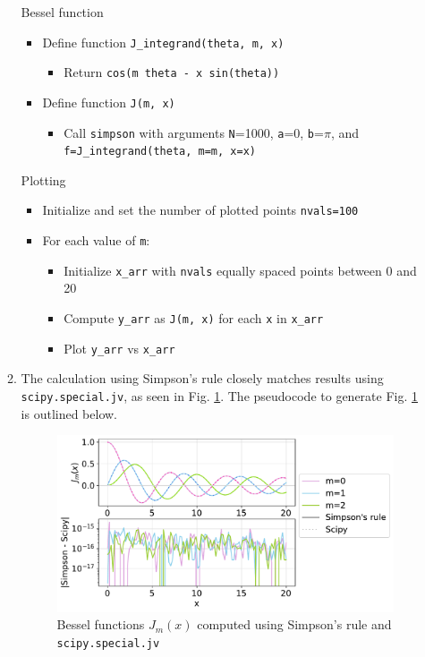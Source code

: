 \documentclass{article}
\newcommand{\code}{\texttt}
\begin{document}
\begin{enumerate}
\begin{enumerate}
    Bessel function
    \begin{itemize}
        \item Define function \code{J\_integrand(theta, m, x)}
        \begin{itemize}
            \item Return \code{cos(m theta - x sin(theta))}
        \end{itemize}
        \item Define function \code{J(m, x)}
        \begin{itemize}
            \item Call \code{simpson} with arguments \code{N}=1000, \code{a}=0, \code{b}=$\pi$, and \code{f=J\_integrand(theta, m=m, x=x)}
        \end{itemize}
    \end{itemize}

    Plotting 
    \begin{itemize}
        \item Initialize and set the number of plotted points \code{nvals=100}
        \item For each value of \code{m}:
        \begin{itemize}
            \item Initialize \code{x\_arr} with \code{nvals} equally spaced points between 0 and 20
            \item Compute \code{y\_arr} as \code{J(m, x)} for each \code{x} in \code{x\_arr}
            \item Plot \code{y\_arr} vs \code{x\_arr}
        \end{itemize}
    \end{itemize}

    \item The calculation using Simpson's rule closely matches results using \code{scipy.special.jv}, as seen in Fig. \ref{fig:1b}. The pseudocode to generate Fig. \ref{fig:1b} is outlined below.
    
    \begin{figure}[H]
        \centering
        \includegraphics[width=0.8\linewidth]{1b.pdf}
        \caption{\label{fig:1b} Bessel functions $J_m(x)$ computed using Simpson's rule and \code{scipy.special.jv}}
    \end{figure} 


\end{enumerate}
\end{enumerate}
\end{document}
